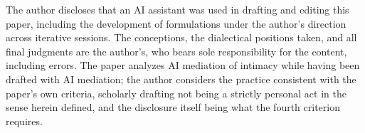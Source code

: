 \documentclass[11pt,a4paper]{article}
\begin{document}
The author discloses that an AI assistant was used in drafting and editing this paper, including the development of formulations under the author's direction across iterative sessions. The conceptions, the dialectical positions taken, and all final judgments are the author's, who bears sole responsibility for the content, including errors. The paper analyzes AI mediation of intimacy while having been drafted with AI mediation; the author considers the practice consistent with the paper's own criteria, scholarly drafting not being a strictly personal act in the sense herein defined, and the disclosure itself being what the fourth criterion requires.

\printbibliography
\end{document}
